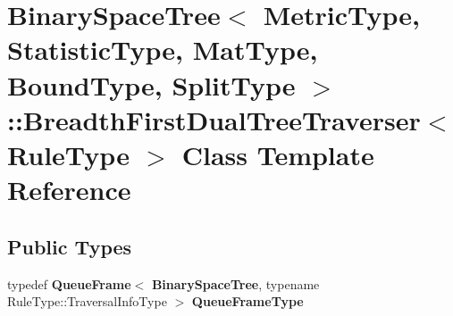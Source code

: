 \section{Binary\+Space\+Tree$<$ Metric\+Type, Statistic\+Type, Mat\+Type, Bound\+Type, Split\+Type $>$\+:\+:Breadth\+First\+Dual\+Tree\+Traverser$<$ Rule\+Type $>$ Class Template Reference}
\label{classmlpack_1_1tree_1_1BinarySpaceTree_1_1BreadthFirstDualTreeTraverser}
\subsection*{Public Types}
\begin{DoxyCompactItemize}
\item 
typedef \textbf{ Queue\+Frame}$<$ \textbf{ Binary\+Space\+Tree}, typename Rule\+Type\+::\+Traversal\+Info\+Type $>$ \textbf{ Queue\+Frame\+Type}
\end{DoxyCompactItemize}
